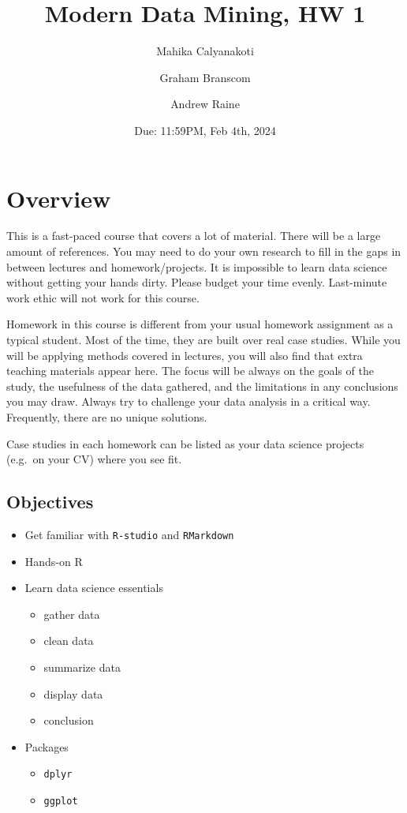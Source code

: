 \documentclass[
]{article}
\title{Modern Data Mining, HW 1}
\author{Mahika Calyanakoti \and Graham Branscom \and Andrew Raine}
\date{Due: 11:59PM, Feb 4th, 2024}
\providecommand{\tightlist}{%
  \setlength{\itemsep}{0pt}\setlength{\parskip}{0pt}}
\begin{document}
\maketitle

{
\hypersetup{linkcolor=}
\setcounter{tocdepth}{4}
\tableofcontents
}
\pagebreak

\hypertarget{overview}{%
\section{Overview}\label{overview}}

This is a fast-paced course that covers a lot of material. There will be
a large amount of references. You may need to do your own research to
fill in the gaps in between lectures and homework/projects. It is
impossible to learn data science without getting your hands dirty.
Please budget your time evenly. Last-minute work ethic will not work for
this course.

Homework in this course is different from your usual homework assignment
as a typical student. Most of the time, they are built over real case
studies. While you will be applying methods covered in lectures, you
will also find that extra teaching materials appear here. The focus will
be always on the goals of the study, the usefulness of the data
gathered, and the limitations in any conclusions you may draw. Always
try to challenge your data analysis in a critical way. Frequently, there
are no unique solutions.

Case studies in each homework can be listed as your data science
projects (e.g.~on your CV) where you see fit.

\hypertarget{objectives}{%
\subsection{Objectives}\label{objectives}}

\begin{itemize}
\tightlist
\item
  Get familiar with \texttt{R-studio} and \texttt{RMarkdown}
\item
  Hands-on R
\item
  Learn data science essentials

  \begin{itemize}
  \tightlist
  \item
    gather data
  \item
    clean data
  \item
    summarize data
  \item
    display data
  \item
    conclusion
  \end{itemize}
\item
  Packages

  \begin{itemize}
  \tightlist
  \item
    \texttt{dplyr}
  \item
    \texttt{ggplot}
  \end{itemize}
\end{itemize}
\end{document}
